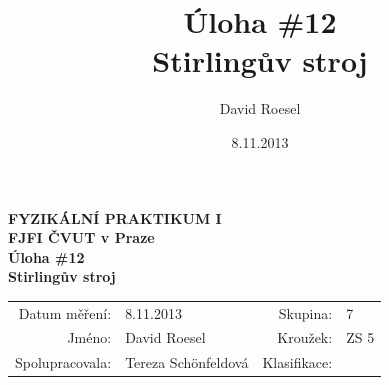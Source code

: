 \documentclass[english]{article}
\newcommand{\Author}{David Roesel}
\newcommand{\Coauthor}{Tereza Schönfeldová}
\newcommand{\Institute}{FJFI ČVUT v Praze}
\newcommand{\Subject}{FYZIKÁLNÍ PRAKTIKUM I}
\newcommand{\Group}{7}
\newcommand{\Circle}{ZS 5}
\newcommand{\Title}{Úloha \#12 \\Stirlingův stroj}
\newcommand{\Date}{8.11.2013}
\begin{document}
\author{\Author}
\title{\Title}
\date{\Date}

\renewcommand{\figurename}{Obr.}
\renewcommand{\tablename}{Tab.}
\renewcommand{\refname}{Reference}


\setlength{\parindent}{0cm}
\begin{multicols}{2}
\textbf{\Subject \\
        \Institute \\[0.1cm]
\Title \\[0.5cm]
}
\begin{tabular}{rlrl}
\large Datum měření: & \Date & \large Skupina: & \Group \\
\large Jméno: & \Author & \large Kroužek:  & \Circle\\
\large Spolupracovala: & \Coauthor &\large Klasifikace:\\
\end{tabular}


\end{multicols}
\end{document}
